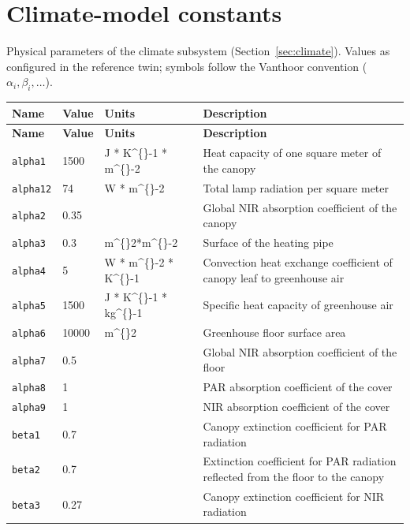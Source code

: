 \documentclass[11pt,a4paper]{article}
\begin{document}
\fussy
\appendix


\section{Climate-model constants}\label{app:climate}
Physical parameters of the climate subsystem (Section~\ref{sec:climate}). Values as configured in the reference twin; symbols follow the Vanthoor convention ($\alpha_i,\beta_i,\dots$).
\begin{longtable}{@{}p{} p{} p{} p{}@{}}
\toprule
\textbf{Name} & \textbf{Value} & \textbf{Units} & \textbf{Description}\\
\midrule
\endfirsthead
\toprule
\textbf{Name} & \textbf{Value} & \textbf{Units} & \textbf{Description}\\
\midrule
\endhead
\texttt{alpha1} & 1500 & J * K\textasciicircum\{\}-1 * m\textasciicircum\{\}-2 & Heat capacity of one square meter of the canopy\\
\texttt{alpha12} & 74 & W * m\textasciicircum\{\}-2 & Total lamp radiation per square meter \\
\texttt{alpha2} & 0.35 &  & Global NIR absorption coefficient of the canopy\\
\texttt{alpha3} & 0.3 & m\textasciicircum\{\}2*m\textasciicircum\{\}-2 & Surface of the heating pipe\\
\texttt{alpha4} & 5 & W * m\textasciicircum\{\}-2 * K\textasciicircum\{\}-1 & Convection heat exchange coefficient of canopy leaf to greenhouse air\\
\texttt{alpha5} & 1500 & J * K\textasciicircum\{\}-1 * kg\textasciicircum\{\}-1 & Specific heat capacity of greenhouse air\\
\texttt{alpha6} & 10000 & m\textasciicircum\{\}2 & Greenhouse floor surface area\\
\texttt{alpha7} & 0.5 &  & Global NIR absorption coefficient of the floor\\
\texttt{alpha8} & 1 &  & PAR absorption coefficient of the cover\\
\texttt{alpha9} & 1 &  & NIR absorption coefficient of the cover\\
\texttt{beta1} & 0.7 &  & Canopy extinction coefficient for PAR radiation\\
\texttt{beta2} & 0.7 &  & Extinction coefficient for PAR radiation reflected from the floor to the canopy\\
\texttt{beta3} & 0.27 &  & Canopy extinction coefficient for NIR radiation\\

\end{longtable}
\end{document}
